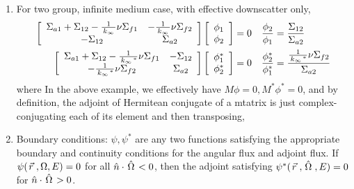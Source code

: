 \documentclass{school-22.211-notes}
\begin{document}
\begin{enumerate}
  \item For two group, infinite medium case, with effective downscatter only, 
    \begin{align}
      \left[ \begin{array}{cc}
          \Sigma_{a1} + \Sigma_{12} - \frac{1}{\left. k_{\infty} \right.} \nu \Sigma_{f1} & - \frac{1}{\left. k_{\infty} \right.} \nu \Sigma_{f2} \\
          - \Sigma_{12} & \Sigma_{a2} \end{array} \right] 
      \left[ \begin{array}{c}
          \phi_1 \\ \phi_2 \end{array} \right] &= 0  
      &\frac{\phi_2}{\phi_1} &= \frac{\Sigma_{12}}{\Sigma_{a2}}   \\
      \left[ \begin{array}{cc}
          \Sigma_{a1} + \Sigma_{12} - \frac{1}{\left. k_{\infty} \right.^*} \nu \Sigma_{f1} & - \Sigma_{12} \\
          - \frac{1}{\left. k_{\infty} \right.^*} \nu \Sigma_{f2} & \Sigma_{a2} \end{array} \right] 
      \left[ \begin{array}{c}
          \phi_1^* \\ \phi_2^* \end{array} \right] &= 0  
      &\frac{\phi_2^*}{\phi_1^*} &= \frac{\frac{1}{\left. k_{\infty} \right.^*} \nu \Sigma_{f2}}{\Sigma_{a2}}  
    \end{align}
    where 
    In the above example, we effectively have $M \phi = 0, M^* \phi^* = 0$, and by definition, the adjoint of Hermitean conjugate of a mtatrix is just complex-conjugating each of its element and then transposing, 
 
  \item Boundary conditions: $\psi, \psi^*$ are any two functions satisfying the appropriate boundary and continuity conditions for the angular flux and adjoint flux. If $\psi(\left.\vec{r}\right., \Omega, E) = 0$ for all $\hat{n} \cdot \left. \hat{\Omega} \right. < 0$, then the adjoint satisfying $\psi^*(\left.\vec{r}\right., \left. \hat{\Omega} \right., E) = 0$ for $\hat{n} \cdot \left. \hat{\Omega} \right. > 0$. 



\end{enumerate}
\end{document}
